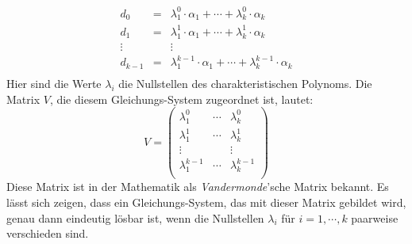 \[
\begin{array}{lcl}
  d_0     & = & \lambda_1^0 \cdot \alpha_1 + \cdots +   \lambda_k^0 \cdot \alpha_k \\[0.2cm]
  d_1     & = & \lambda_1^1 \cdot \alpha_1 + \cdots +   \lambda_k^1 \cdot \alpha_k \\[0.2cm]
  \vdots  &   & \vdots                                                   \\[0.2cm]
  d_{k-1} & = & \lambda_1^{k-1} \cdot \alpha_1 + \cdots +   \lambda_{k}^{k-1} \cdot \alpha_k \\[0.2cm]
\end{array}
\]
Hier sind die Werte $\lambda_i$  die Nullstellen des charakteristischen Polynoms.  
Die Matrix $V$, die diesem Gleichungs-System
zugeordnet ist, lautet: 
\[
V = \left(
\begin{array}{lcl}
  \lambda_1^0  & \cdots &   \lambda_k^0 \\[0.2cm]
  \lambda_1^1  & \cdots &   \lambda_k^1 \\[0.2cm]
  \vdots         &         & \vdots \\[0.2cm]
  \lambda_1^{k-1} & \cdots &   \lambda_{k}^{k-1} \\[0.2cm]
\end{array}\right)
\]
Diese Matrix ist in der Mathematik als \emph{Vandermonde}'sche Matrix bekannt.  
Es l\"{a}sst sich zeigen, dass ein Gleichungs-System, das mit dieser Matrix gebildet wird,
genau dann eindeutig l\"{o}sbar ist, wenn die Nullstellen $\lambda_i$ f\"{u}r $i=1,\cdots,k$
paarweise verschieden sind.
\vspace*{0.2cm}

